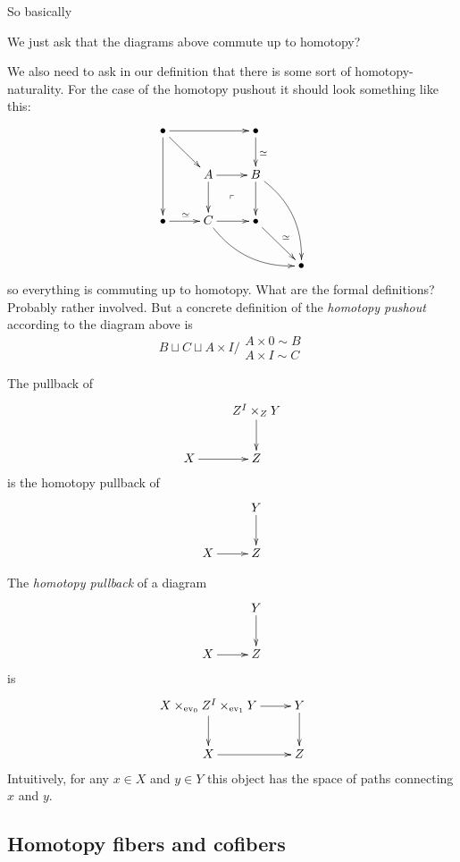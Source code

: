 So basically
\begin{definition}
\label{definition-homot-pullb-homot-pusho}
	We just ask that the diagrams above commute
	up to homotopy?
\end{definition}
\begin{remark}
\label{remark-concr-const-homot-pusho}
	We also need to ask in our definition that
	there is some sort of homotopy-naturality.
	For the case of the homotopy pushout it
	should look something like this:
		$$
		\xymatrix{
			\bullet\ar[rr]\ar[dd]\ar[dr]
			&&\bullet\ar[d]^{\simeq}\\
			&A\ar[r]\ar[d]&B\ar[d]\ar@/^1pc/[ddr]\\
			\bullet\ar[r]^{\simeq}
			&C\ar[r]\ar@/_1pc/[drr]
			&\bullet\ar@{}[ul]|{\ulcorner}\ar[dr]
			^{\simeq}\\
			&&&\bullet
		}
		$$
	so everything is commuting up to homotopy.
	What are the formal definitions? Probably
	rather involved. But a concrete definition
	of the {\it homotopy pushout} according to
	the diagram above is
	$$B\sqcup C\sqcup A\times
	I\Big/\substack{A\times 0\sim B \\ A\times
	I\sim C}$$
\end{remark}
\begin{remark}
\label{remark-from-lecture-notes}
		The pullback of
	$$
	\xymatrix{
		&Z^I\times_ZY\ar[d]\\
		X\ar[r]&Z
	}
	$$
	is the homotopy pullback of
	$$
	\xymatrix{
		&Y\ar[d]\\
		X\ar[r]&Z
	}
	$$
\end{remark}
\begin{definition}
\label{definition-lectu-notes-right}
	The {\it homotopy pullback} of a diagram
		$$
		\xymatrix{
			&Y\ar[d]\\
			X\ar[r]&Z
		}
		$$
		is
		$$
		\xymatrix{
			X\times_{\text{ev}_0}Z^I\times_{\text{ev}
			_1}Y
			\ar[d]\ar[r]&Y\ar[d]\\
			X\ar[r]&Z
		}
		$$
		Intuitively, for any $x\in X$ and $y\in Y$
		this object has the space of paths
		connecting $x$ and $y$.
\end{definition}

\subsection{Homotopy fibers and cofibers}
\label{subsection-homot-fiber-cofib}

